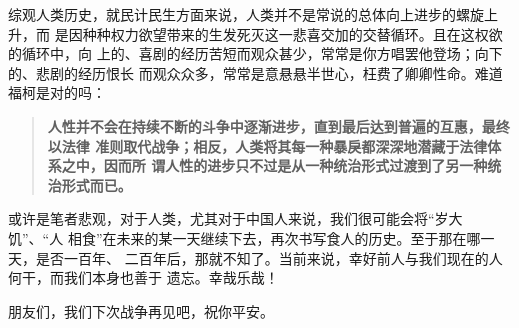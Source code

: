 综观人类历史，就民计民生方面来说，人类并不是常说的总体向上进步的螺旋上升，而
是因种种权力欲望带来的生发死灭这一悲喜交加的交替循环。且在这权欲的循环中，向
上的、喜剧的经历苦短而观众甚少，常常是你方唱罢他登场；向下的、悲剧的经历恨长
而观众众多，常常是意悬悬半世心，枉费了卿卿性命。难道福柯是对的吗：
\begin{quotation}
  \textbf{人性并不会在持续不断的斗争中逐渐进步，直到最后达到普遍的互惠，最终以法律
    准则取代战争；相反，人类将其每一种暴戾都深深地潜藏于法律体系之中，因而所
    谓人性的进步只不过是从一种统治形式过渡到了另一种统治形式而已。}
\end{quotation}


或许是笔者悲观，对于人类，尤其对于中国人来说，我们很可能会将“岁大饥”、“人
相食”在未来的某一天继续下去，再次书写食人的历史。至于那在哪一天，是否一百年、
二百年后，那就不知了。当前来说，幸好前人与我们现在的人何干，而我们本身也善于
遗忘。幸哉乐哉！\bigskip


朋友们，我们下次战争再见吧，祝你平安。
